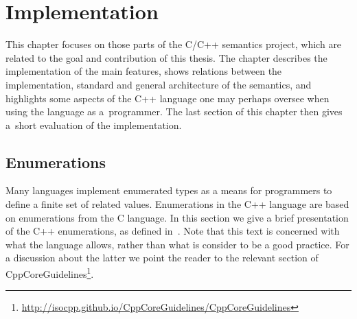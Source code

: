 \documentclass{fithesis3}
\begin{document}




\chapter{Implementation}

This chapter focuses on those parts of the C/C++ semantics project, which are related to the goal and contribution of this thesis. The chapter describes the implementation of the main features, shows relations between the implementation, standard and general architecture of the semantics, and highlights some aspects of the C++ language one may perhaps oversee when using the language as a~programmer. The last section of this chapter then gives a~short evaluation of the implementation.

	


\section{Enumerations}

Many languages implement enumerated types as a means for programmers to define a finite set of related values. Enumerations in the C++ language are based on enumerations from the C language. In this section we give a brief presentation of the C++ enumerations, as defined in~\cite{n4296}. Note that this text is concerned with what the language allows, rather than what is consider to be a good practice. For a discussion about the latter we point the reader to the relevant section of CppCoreGuidelines\footnote{\url{http://isocpp.github.io/CppCoreGuidelines/CppCoreGuidelines}}. 
\end{document}

